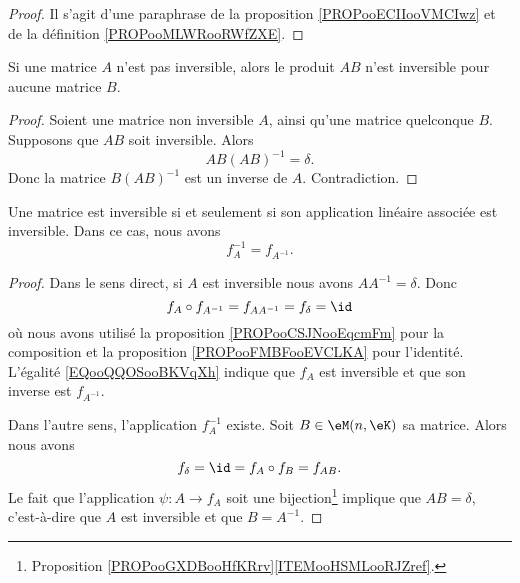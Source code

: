 \begin{proof}
	Il s'agit d'une paraphrase de la proposition \ref{PROPooECIIooVMCIwz} et de la définition \ref{PROPooMLWRooRWfZXE}.
\end{proof}

\begin{lemma}       \label{LEMooZDNVooArIXzC}
	Si une matrice \( A\) n'est pas inversible, alors le produit \( AB\) n'est inversible pour aucune matrice \( B\).
\end{lemma}

\begin{proof}
	Soient une matrice non inversible \( A\), ainsi qu'une matrice quelconque \( B\). Supposons que \( AB\) soit inversible. Alors
	\begin{equation}
		AB(AB)^{-1}=\delta.
	\end{equation}
	Donc la matrice \( B(AB)^{-1}\) est un inverse de \( A\). Contradiction.
\end{proof}

\begin{proposition}     \label{PROPooNPMCooPmaCwu}
	Une matrice est inversible si et seulement si son application linéaire associée est inversible. Dans ce cas, nous avons
	\begin{equation}
		f_A^{-1}=f_{A^{-1}}.
	\end{equation}
\end{proposition}

\begin{proof}
	Dans le sens direct, si \( A\) est inversible nous avons \( AA^{-1}=\delta\). Donc
	\begin{equation}        \label{EQooQQOSooBKVqXh}
		f_A\circ f_{A^{-1}}=f_{AA^{-1}}=f_{\delta}=\id
	\end{equation}
	où nous avons utilisé la proposition \ref{PROPooCSJNooEqcmFm} pour la composition et la proposition \ref{PROPooFMBFooEVCLKA} pour l'identité. L'égalité \eqref{EQooQQOSooBKVqXh} indique que \( f_A\) est inversible et que son inverse est \( f_{A^{-1}}\).

	Dans l'autre sens, l'application \( f_A^{-1}\) existe. Soit \( B\in \eM(n,\eK)\) sa matrice. Alors nous avons
	\begin{equation}
		f_{\delta}=\id=f_A\circ f_B=f_{AB}.
	\end{equation}
	Le fait que l'application \(\psi\colon A\to f_A\) soit une bijection\footnote{Proposition \ref{PROPooGXDBooHfKRrv}\ref{ITEMooHSMLooRJZref}.} implique que \( AB=\delta\), c'est-à-dire que \( A\) est inversible et que \( B=A^{-1}\).
\end{proof}

